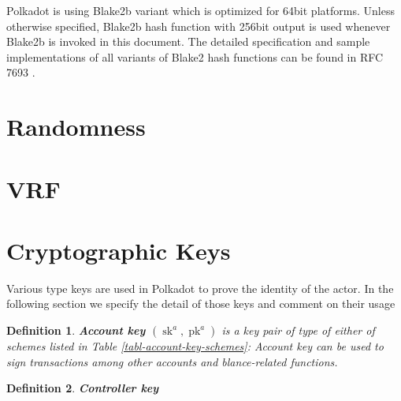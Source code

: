 \documentclass{book}
\newcommand{\tmop}[1]{\ensuremath{\operatorname{#1}}}
\newcommand{\tmstrong}[1]{\textbf{#1}}
\newcommand{\tmtextbf}[1]{{\bfseries{#1}}}
\newtheorem{definition}{Definition}
\providecommand{\tmop}[1]{\ensuremath{\mathrm{#1}}}
\providecommand{\tmstrong}[1]{\tmtextbf{#1}}
\providecommand{\tmtextbf}[1]{\tmtextbf{#1}}
\newtheorem{definition}{Definition}
\begin{document}
Polkadot is using Blake2b variant which is optimized for 64bit platforms.
Unless otherwise specified, Blake2b hash function with 256bit output is used
whenever Blake2b is invoked in this document. The detailed specification and
sample implementations of all variants of Blake2 hash functions can be found
in RFC 7693 {\cite{saarinen_blake2_2015}}.

\section{Randomness}\label{sect-randomness}

\section{VRF}\label{sect-vrf}

\section{Cryptographic Keys}\label{sect-cryptographic-keys}

Various type keys are used in Polkadot to prove the identity of the actor. In
the following section we specify the detail of those keys and comment on their
usage

\begin{definition}
  \label{defn-account-key}{\tmstrong{Account key $(\tmop{sk}^a,
  \tmop{pk}^a)$}} is a key pair of type of either of schemes listed in Table
  \ref{tabl-account-key-schemes}:
  {}
  Account key can be used to sign transactions among other accounts and
  blance-related functions.
\end{definition}

\begin{definition}
  {\tmstrong{Controller key}} {}
\end{definition}
\end{document}
